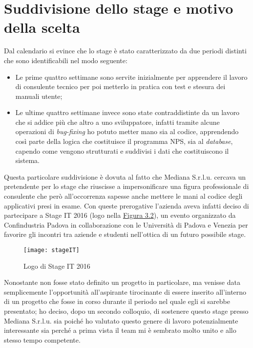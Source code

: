 \section{Suddivisione dello stage e motivo della scelta}
Dal calendario si evince che lo stage è stato caratterizzato da due periodi distinti che sono identificabili nel modo seguente:
\begin{itemize}
\item Le prime quattro settimane sono servite inizialmente per apprendere il lavoro di consulente tecnico per poi metterlo in pratica con test e stesura dei manuali utente;
\item Le ultime quattro settimane invece sono state contraddistinte da un lavoro che si addice più che altro a uno sviluppatore, infatti tramite alcune operazioni di \textit{bug-fixing} ho potuto metter mano sia al codice, apprendendo così parte della logica che costituisce il programma NPS, sia al \textit{database}, capendo come vengono strutturati e suddivisi i dati che costituiscono il sistema.
\end{itemize}
Questa particolare suddivisione è dovuta al fatto che Mediana S.r.l.u. cercava un pretendente per lo stage che riuscisse a impersonificare una figura professionale di consulente che però all'occorrenza sapesse anche mettere le mani al codice degli applicativi presi in esame.
Con queste prerogative l'azienda aveva infatti deciso di partecipare a Stage IT 2016 (logo nella \hyperref[stage IT]{Figura 3.2}), un evento organizzato da Confindustria Padova in collaborazione con le Università di Padova e Venezia per favorire gli incontri tra aziende e studenti nell'ottica di un futuro possibile stage.

\begin{figure}[h!]
\begin{center}
\texttt{[image: stageIT]}
\caption{Logo di Stage IT 2016}
\label{stage IT}
\end{center}
\end{figure}
\FloatBarrier

Nonostante non fosse stato definito un progetto in particolare, ma venisse data semplicemente l'opportunità all'aspirante tirocinante di essere inserito all'interno di un progetto che fosse in corso durante il periodo nel quale egli si sarebbe presentato; ho deciso, dopo un secondo colloquio, di sostenere questo stage presso Mediana S.r.l.u. sia poiché ho valutato questo genere di lavoro potenzialmente interessante sia perché a prima vista il team mi è sembrato molto unito e allo stesso tempo competente.

